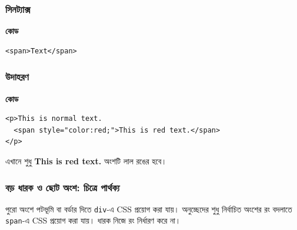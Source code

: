 \par\noindent
\begin{minipage}[t]{.42\linewidth}\vspace{0pt}\small
\subsubsection{সিনট্যাক্স}

\textbf{\color{chFourTeal}কোড}\par
\begin{verbatim}
<span>Text</span>
\end{verbatim}

\par\smallskip
\end{minipage}\hfill
\begin{minipage}[t]{.54\linewidth}\vspace{0pt}\small
\subsubsection{উদাহরণ}

\textbf{\color{chFourTeal}কোড}\par
\begin{verbatim}
<p>This is normal text.
  <span style="color:red;">This is red text.</span>
</p>
\end{verbatim}

\par\smallskip


এখানে শুধু \textbf{This is red text.} অংশটি লাল রঙের হবে।
\end{minipage}\par
\subsubsection{বড় ধারক ও ছোট অংশ: চিত্রে পার্থক্য}
\begin{center}
\end{center}
পুরো অংশে পটভূমি বা বর্ডার দিতে \texttt{div}-এ CSS প্রয়োগ করা যায়। অনুচ্ছেদের শুধু নির্বাচিত অংশের রং বদলাতে \texttt{span}-এ CSS প্রয়োগ করা যায়। ধারক নিজে রং নির্ধারণ করে না।

